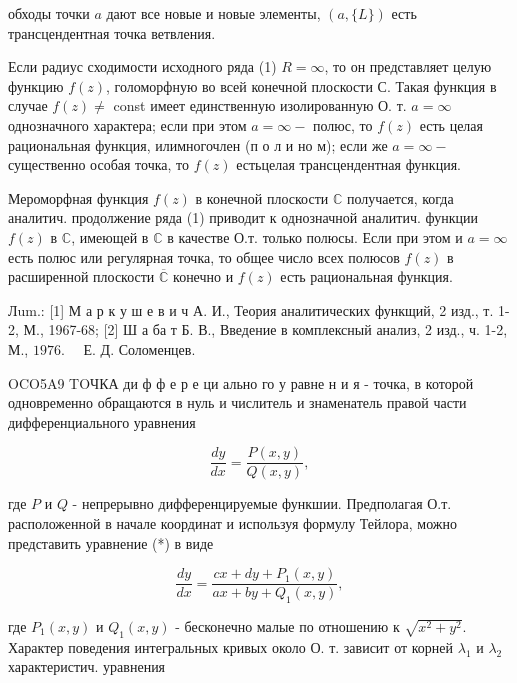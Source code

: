 \documentclass[10pt]{article}
\begin{document}
обходы точки $a$ дают все новые и новые элементы, $(a,\{L\})$ есть трансцендентная точка ветвления.



Если радиус сходимости исходного ряда (1) $R=\infty$, то он представляет целую функцию $f(z)$, голоморфную во всей конечной плоскости С. Такая функция в случае $f(z) \neq$ const имеет единственную изолированную О. т. $a=\infty$ однозначного характера; если при этом $a=\infty-$ полюс, то $f(z)$ есть целая рациональная функция, илимногочлен (п о л и но м); если же $a=\infty-$ существенно особая точка, то $f(z)$ естьцелая трансцендентная функция.



Мероморфная функция $f(z)$ в конечной плоскости $\mathbb{C}$ получается, когда аналитич. продолжение ряда (1) приводит к однозначной аналитич. функции $f(z)$ в $\mathbb{C}$, имеющей в $\mathbb{C}$ в качестве О.т. только полюсы. Если при этом и $a=\infty$ есть полюс или регулярная точка, то общее число всех полюсов $f(z)$ в расширенной плоскости $\overline{\mathbb{C}}$ конечно и $f(z)$ есть рациональная функция.



Лum.: [1] М а р к у ш е в и ч А. И., Теория аналитических функщий, 2 изд., т. 1-2, М., 1967-68; [2] Ш а ба т Б. В., Введение в комплексный анализ, 2 изд., ч. 1-2, М., $1976 . \quad$ Е. Д. Соломенцев.



OCO5A9 TOЧКА ди ф ф е р е ци ально го у равне н и я - точка, в которой одновременно обращаются в нуль и числитель и знаменатель правой части дифференциального уравнения



\[

\frac{d y}{d x}=\frac{P(x, y)}{Q(x, y)},

\]



где $P$ и $Q$ - непрерывно дифференцируемые функшии. Предполагая О.т. расположенной в начале координат и используя формулу Тейлора, можно представить уравнение (*) в виде



\[

\frac{d y}{d x}=\frac{c x+d y+P_{1}(x, y)}{a x+b y+Q_{1}(x, y)},

\]



где $P_{1}(x, y)$ и $Q_{1}(x, y)$ - бесконечно малые по отношению к $\sqrt{x^{2}+y^{2}}$. Характер поведения интегральных кривых около О. т. зависит от корней $\lambda_{1}$ и $\lambda_{2}$ характеристич. уравнения
\end{document}
